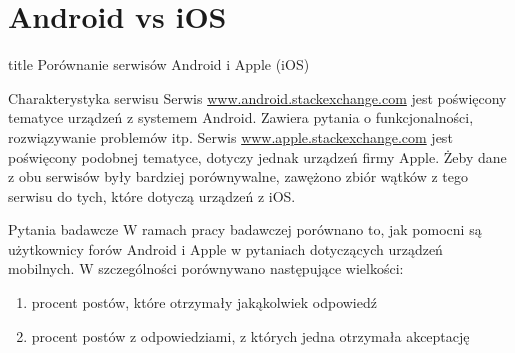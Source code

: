 \documentclass[./main.tex]{subfiles}
\begin{document}
\section{Android vs iOS}

\begin{frame}
\vfill
\centering
\begin{beamercolorbox}[sep=8pt,center,shadow=true,rounded=true]{title}
     Porównanie serwisów Android i Apple (iOS)
\end{beamercolorbox}
\vfill
\end{frame}

\begin{frame}{Charakterystyka serwisu}
    Serwis \url{www.android.stackexchange.com} jest poświęcony tematyce urządzeń z systemem Android. Zawiera pytania o funkcjonalności, rozwiązywanie problemów itp.
    \newline \newline
    Serwis \url{www.apple.stackexchange.com} jest poświęcony podobnej tematyce, dotyczy jednak urządzeń firmy Apple. 
    Żeby dane z obu serwisów były bardziej porównywalne, zawężono zbiór wątków z tego serwisu do tych, które dotyczą urządzeń z iOS.
    
\end{frame}


\begin{frame}{Pytania badawcze}
    W ramach pracy badawczej porównano to, jak pomocni są użytkownicy forów Android i Apple w pytaniach dotyczących urządzeń mobilnych.
    \newline \newline
    W szczególności porównywano następujące wielkości:
    \begin{enumerate}
        \item procent postów, które otrzymały jakąkolwiek odpowiedź
        \item procent postów z odpowiedziami, z których jedna otrzymała akceptację
    \end{enumerate}
\end{frame}
\end{document}
